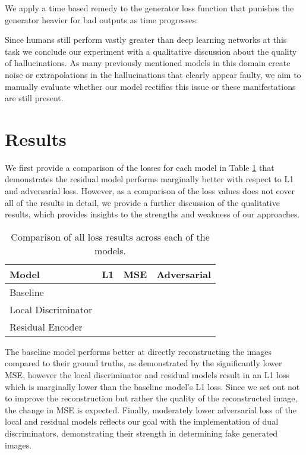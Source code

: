 \documentclass{article}
\begin{document}
We apply a time based remedy to the generator loss function that punishes the generator heavier for bad outputs as time progresses:

Since humans still perform vastly greater than deep learning networks at this task we conclude our experiment with a qualitative discussion about the quality of hallucinations. As many previously mentioned models in this domain create noise or extrapolations in the hallucinations that clearly appear faulty, we aim to manually evaluate whether our model rectifies this issue or these manifestations are still present.

\section{Results}
We first provide a comparison of the losses for each model in Table \ref{tab:4} that demonstrates the residual model performs marginally better with respect to L1 and adversarial loss. However, as a comparison of the loss values does not cover all of the results in detail, we provide a further discussion of the qualitative results, which provides insights to the strengths and weakness of our approaches.

\begin{table}[h] 
  \centering  
    \begin{tabular}{lrrr}
    \hline
    \textbf{Model} & \textbf{L1} & \textbf{MSE} & \textbf{Adversarial}\\ 
    \hline \hline
      Baseline &  &  &  \\
      Local Discriminator &  &  &  \\
      Residual Encoder &  &  &  \\
    \hline
    \end{tabular}
  
  \caption{Comparison of all loss results across each of the models.} 
  \label{tab:4}
\end{table}

The baseline model performs better at directly reconstructing the images compared to their ground truths, as demonstrated by the significantly lower MSE, however the local discriminator and residual models result in an L1 loss which is marginally lower than the baseline model's L1 loss. Since we set out not to improve the reconstruction but rather the quality of the reconstructed image, the change in MSE is expected. Finally,  moderately lower adversarial loss of the local and residual models reflects our goal with the implementation of dual discriminators, demonstrating their strength in determining fake generated images.
\end{document}
